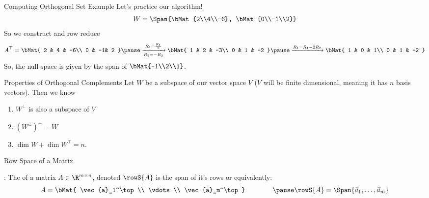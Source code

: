 \documentclass[xcoler=dvipsnames, aspectratio=169]{beamer}
\begin{document}
    \begin{frame}{Computing Orthogonal Set Example}
        Let's practice our algorithm!
        \[
            W=\Span{\bMat{2\\4\\-6}, \bMat{0\\-1\\2}}
        \]
        So we construct and row reduce
        \[
            A^\top = \bMat{
                2 & 4 & -6\\
                0 & -1&  2
            }\pause\xrightarrow[R_2=-R_2]{R_1=\frac{R_1}{2}}\bMat{
                1 & 2 & -3\\
                0 & 1 & -2
            }\pause\xrightarrow{R_1 = R_1-2R_2}\bMat{
                1 & 0 &  1\\
                0 & 1 & -2
            }
        \]
        So, the null-space is given by the span of $\bMat{-1\\2\\1}$.
    \end{frame}
    \begin{frame}{Properties of Orthogonal Complements}
        Let $W$ be a subspace of our vector space $V$ ($V$ will be finite dimensional, meaning it
        has $n$ basis vectors). Then we know
        \begin{enumerate}
            \pause\item $W^\perp$ is also a subspace of $V$
            \pause\item $\left(W^\perp\right)^\perp = W$
            \pause\item $\dim{W} + \dim{W^\top} = n$.
        \end{enumerate}
    \end{frame}
    \begin{frame}{Row Space of a Matrix}
        \begin{defn}
            : The  of a matrix $A\in\R^{m\times n}$,
            denoted $\rowS{A}$ is the span of it's rows or equivalently:\pause
            \[
                A = \bMat{
                    \vec{a}_1^\top\\
                    \vdots\\
                    \vec{a}_m^\top
                }\qquad\qquad\pause\rowS{A} = \Span{\vec{a}_1, \dots, \vec{a}_m}
            \]
        \end{defn}
    \end{frame}
\end{document}
